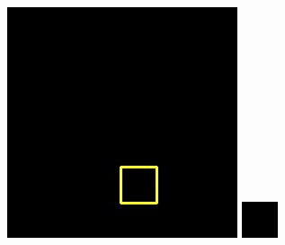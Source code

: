 \documentclass[UTF8]{ctexart}
\begin{document}
\begin{figure}[H]
{\begin{minipage}[b]{0.15\linewidth}
            \includegraphics[width=1\linewidth]{../log/cut/LC80650182013237LGN00_10854_mask.jpg}\vspace{4pt}
            \includegraphics[width=1\linewidth]{../log/cut/tmp_cut_LC80650182013237LGN00_10854_mask.jpg}

\end{minipage}}
\end{figure}
\end{document}
